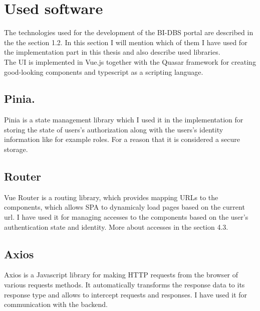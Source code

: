 \section{Used software} The technologies used for the development of the BI-DBS portal are described in the the section 1.2. In this section I will mention which of them I have used for the implementation part in this thesis and also describe used libraries.\\
The UI is implemented in Vue.js together with the Quasar framework for creating good-looking components and typescript as a scripting language. 

\subsection{Pinia.} Pinia is a state management library which I used it in the implementation for storing the state of users's authorization along with the users's identity information like for example roles. For a reason that it is considered a secure storage.

\subsection{Router} Vue Router is a routing library, which provides mapping URLs to the components, which allows SPA to dynamicaly load pages based on the current url. I have used it for managing accesses to the components based on the user's authentication state and identity. More about accesses in the section 4.3.

\subsection{Axios} Axios is a Javascript library for making HTTP requests from the browser of various requests methods. It automatically transforms the response data to its response type and allows to intercept requests and responses. I have used it for communication with the backend.
